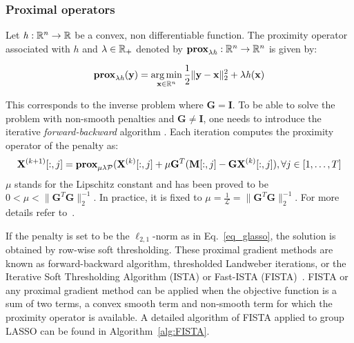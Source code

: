 \subsubsection*{Proximal operators}
Let $\mathit{h}:\mathbb{R}^n\rightarrow\mathbb{R}$ be a convex, non differentiable function. The proximity operator associated with $\mathit{h}$ and $\lambda\in\mathbb{R}_+$ denoted by
$\textbf{prox}_{\lambda\mathit{h}}:\mathbb{R}^n\rightarrow\mathbb{R}^n$ is given by:

\begin{equation}
\textbf{prox}_{\lambda\mathit{h}}(\mathbf{y})=\mathop{\mathrm{arg}\,\mathrm{min}}_{\mathbf{x}\in\mathbb{R}^n}\frac{1}{2}\|\mathbf{y}-\mathbf{x}\|_2^2+\lambda\mathit{h}(\mathbf{x})
\end{equation}

This corresponds to the inverse problem where $\mathbf{G}=\mathbf{I}$. To be able to solve the problem with non-smooth penalties and $\mathbf{G}\neq\mathbf{I}$, one needs to introduce the iterative \textit{forward-backward} algorithm \cite{moreau1965proximite}. Each iteration computes the proximity operator of the penalty as:
\begin{equation}
\mathbf{X}^{(k+1)}[:,j]=\textbf{prox}_{\mu\lambda\mathcal{P}}(\mathbf{X}^{(k)}[:,j]+\mu\mathbf{G}^T(\mathbf{M}[:,j]-\mathbf{GX}^{(k)}[:,j]), \forall j\in [1,\dots ,T]
\end{equation}
$\mu$ stands for the Lipschitz constant and has been proved to be $0<\mu<\|\mathbf{G}^T\mathbf{G}\|_2^{-1}$. In practice, it is fixed to $\mu=\frac{1}{\mathcal{L}}=
 \|\mathbf{G}^T\mathbf{G}\|_2^{-1}$. For more details refer to~\cite{moreau1965proximite,combettes2005signal,daubechies2004iterative}.

If the penalty is set to be the $\ell_{2,1}$-norm as in Eq.~\eqref{eq_glasso}, the solution is obtained by row-wise soft thresholding. These proximal gradient methods are known as forward-backward algorithm, thresholded Landweber iterations, or the Iterative Soft Thresholding Algorithm (ISTA) or Fast-ISTA (FISTA)~\cite{bach-etal:2012,parikh2014proximal}. FISTA or any proximal gradient method can be applied when the objective function is a sum of two terms, a convex smooth term and non-smooth term for which the proximity operator is available.
A detailed algorithm of FISTA applied to group LASSO can be found in Algorithm~\ref{alg:FISTA}. 


